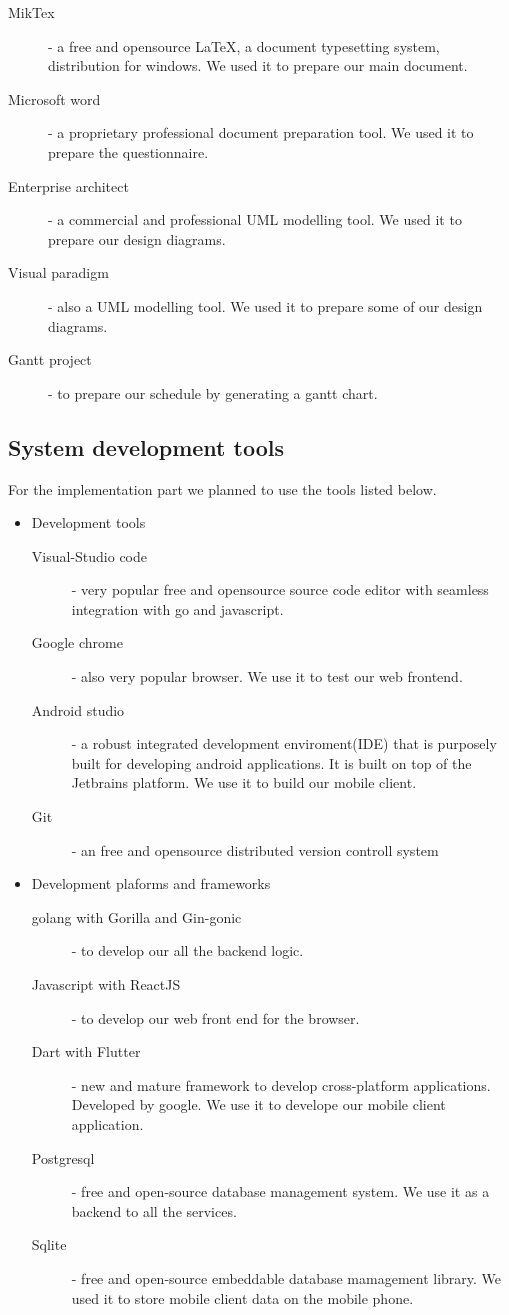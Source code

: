 \begin{description}
	\item[MikTex] - a free and opensource \LaTeX, a document typesetting system, distribution for windows. We used it to prepare our main document.
   \item[Microsoft word] - a proprietary professional document preparation tool. We used it to prepare the questionnaire.
	\item[Enterprise architect] - a commercial and professional UML modelling tool. We used it to prepare our design diagrams.
	\item[Visual paradigm] - also a UML modelling tool. We used it to prepare some of our design diagrams.
	\item[Gantt project] - to prepare our schedule by generating a gantt chart.
\end{description}

		\subsection{System development tools}

For the implementation part we planned to use the tools listed below.
\begin{itemize}
	\item Development tools
	\begin{description}
		\item[Visual-Studio code] - very popular free and opensource source code editor with seamless integration with go and javascript.
		\item[Google chrome] - also very popular browser. We use it to test our web frontend.
		\item[Android studio] - a robust integrated development enviroment(IDE) that is purposely built for developing android applications. It is built on top of the Jetbrains platform. We use it to build our mobile client.
		\item[Git] - an free and opensource distributed version controll system
	\end{description}
	\item Development plaforms and frameworks
	\begin{description}
		\item[golang with Gorilla and Gin-gonic] - to develop our all the backend logic.
		\item[Javascript with ReactJS] - to develop our web front end for the browser.
		\item[Dart with Flutter] - new and mature framework to develop cross-platform applications. Developed by google. We use it to develope our mobile client application.
		\item[Postgresql] - free and open-source database management system. We use it as a backend to all the services.
		\item[Sqlite] - free and open-source embeddable database mamagement library. We used it to store mobile client data on the mobile phone.
	\end{description}


\end{itemize}
